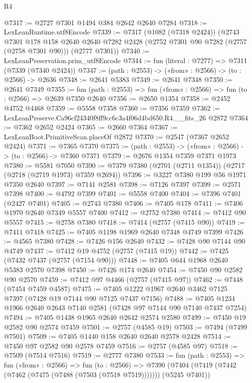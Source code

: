\begin{lexlean}{R4}
\begin{coremodule}
@7317 := @2727 @7301 @1494 @384 @2642 @2640 @7284
@7318 := LexLeanRuntime.utf8Encode
@7339 := @7317
    (@1082 (@7318 @2424))
    (@2743
      @7301
      @178
      @158
      @2640
      @2640
      @7282
      @2428
      (@2752 @7301 @90 @7282 (@2757 (@2758 @7301 @90)))
      (@2777 @7301))
@7340 := LexLeanPreservation.prim_utf8Encode
@7344 := fun (literal : @7277) => @7311 (@7339 (@7340 @2424))
@7347 := (path : @2553) -> («from» : @2566) -> (to : @2566) -> @2636
@7348 := @2641 @5383
@7349 := @2641 @7348
@7350 := @2641 @7349
@7355 := fun (path : @2553) => fun («from» : @2566) => fun (to : @2566) => @2639 @7350 @2640
@7356 := @2650 @1354
@7358 := @2452 @4752 @4468
@7359 := @5558 @7358
@7360 := @7356 @7359
@7362 := LexLeanPreserve.Ca96cf24340f8ff9cc6c3a4f06d4bd650.R4.__fits_26 @2872
@7364 := @7362 @2652 @2424
@7365 := @2660 @7364
@7367 := LexLeanBoot.PrimitiveScan.placeOf @2872
@7370 := @2547 (@7367 @2652 @2424)
@7371 := @7365 @7370
@7375 := (path : @2553) -> («from» : @2566) -> (to : @2566) -> @7360 @7371
@7379 := @2676 @1354 @7359 @7371 @1973
@7380 := @5581 @7050
@7390 := @7379 @7380 (@2701 (@2711 @1354)) (@2717 (@2718 (@2719 @1973) @7359 @2694))
@7396 := @3227 @7380 @199 @56 @1971 @7350 @2640
@7397 := @7141 @2581
@7398 := @7126 @7397
@7399 := @2571 @7398
@7400 := @4792 @7399
@7401 := @5558 @7400
@7404 := @7396 @7401 (@2427 @7401)
@7405 := @2743 @7380
@7406 := @7405 @178
@7411 := @7406 @1970 @2640 @7349 @5557 @7400
@7412 := @2752 @7380
@7414 := @7412 @90 @5557
@7415 := @2758 @7380
@7418 := @7414 (@2757 (@7415 @90))
@7419 := @7411 @7418
@7425 := @7405 @1198 @1969 @2640 @7348 @4749 @7399
@7426 := @4565 @7380
@7428 := @7426 @156 @2640
@7432 := @7428 @90 @7144 @90 @4749
@7437 := @7412 @19 @4752 (@2757 (@7415 @19))
@7442 := @7425 (@7432 @7437 (@2757 (@7154 @90)))
@7448 := @7405 @644 @1968 @2640 @5383 @2570 @7398
@7450 := @7426 @174 @2640
@7454 := @7450 @90 @2582 @90 @2570
@7459 := @7412 @97 @4466 (@2757 (@7415 @97))
@7462 := @7448 (@7454 @7459 @4587)
@7475 := @7405 @1222 @1967 @2640 @3462 @7125 @7397 (@7428 @19 @7144 @90 @7125 @7437 @7156)
@7488 := @7405 @1234 @1966 @2640 @2643 @7140 @2581 (@7428 @97 @7144 @90 @7140 @7437 @7254)
@7494 := @7405 @1438 @1965 @2640 @2642 @2574 @2580
@7499 := @7450 @19 @2582 @90 @2574 @7459
@7501 := @2757 (@4585 @19)
@7503 := @7494 (@7499 @7501)
@7509 := @7405 @1440 @158 @2640 @2640 @2578 @2428
@7514 := @7450 @97 @2582 @90 @2578 @7459
@7516 := @2757 (@4585 @97)
@7518 := @7509 (@7514 @7516)
@7519 := @2777 @7380
@7533 := fun (path : @2553) =>
  fun («from» : @2566) =>
  fun (to : @2566) =>
  @7390 (@7404 (@7419 (@7442 (@7462 (@7475 (@7488 (@7503 (@7518 @7519))))))) (@5245 @7401))

\end{coremodule}
\end{lexlean}
